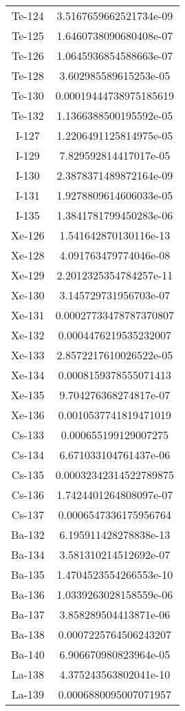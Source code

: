 \begin{table}[h!]
\begin{tabular}{|| c || c |}
Te-124 &  3.5167659662521734e-09 \\
Te-125 &  1.6460738090680408e-07 \\
Te-126 &  1.0645936854588663e-07 \\
Te-128 &  3.602985589615253e-05 \\
Te-130 &  0.00019444738975185619 \\
Te-132 &  1.1366388500195592e-05 \\
I-127 &  1.2206491125814975e-05 \\
I-129 &  7.829592814417017e-05 \\
I-130 &  2.3878371489872164e-09 \\
I-131 &  1.9278809614606033e-05 \\
I-135 &  1.3841781799450283e-06 \\
Xe-126 &  1.541642870130116e-13 \\
Xe-128 &  4.091763479774046e-08 \\
Xe-129 &  2.2012325354784257e-11 \\
Xe-130 &  3.145729731956703e-07 \\
Xe-131 &  0.00027733478787370807 \\
Xe-132 &  0.0004476219535232007 \\
Xe-133 &  2.8572217610026522e-05 \\
Xe-134 &  0.0008159378555071413 \\
Xe-135 &  9.704276368274817e-07 \\
Xe-136 &  0.0010537741819471019 \\
Cs-133 &  0.000655199129007275 \\
Cs-134 &  6.671033104761437e-06 \\
Cs-135 &  0.00032342314522789875 \\
Cs-136 &  1.7424401264808097e-07 \\
Cs-137 &  0.0006547336175956764 \\
Ba-132 &  6.195911428278838e-13 \\
Ba-134 &  3.581310214512692e-07 \\
Ba-135 &  1.4704523554266553e-10 \\
Ba-136 &  1.0339263028158559e-06 \\
Ba-137 &  3.858289504413871e-06 \\
Ba-138 &  0.0007225764506243207 \\
Ba-140 &  6.906670980823964e-05 \\
La-138 &  4.375243563802041e-10 \\
La-139 &  0.0006880095007071957 \\

\end{tabular}
\end{table}
